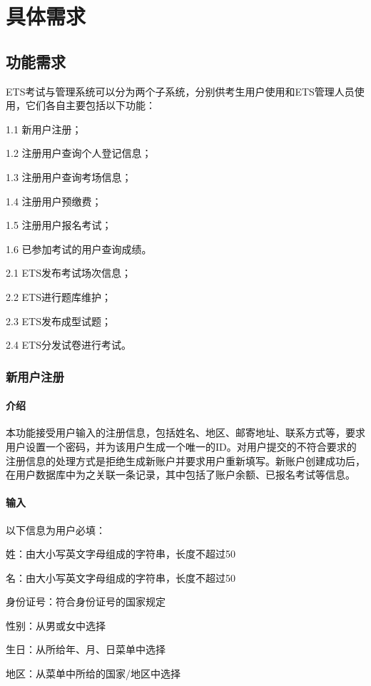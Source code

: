 \chapter{具体需求}

\section{功能需求}
ETS考试与管理系统可以分为两个子系统，分别供考生用户使用和ETS管理人员使用，它们各自主要包括以下功能：

1.1 新用户注册；

1.2 注册用户查询个人登记信息；

1.3 注册用户查询考场信息；

1.4 注册用户预缴费；

1.5 注册用户报名考试；

1.6 已参加考试的用户查询成绩。

2.1 ETS发布考试场次信息；

2.2 ETS进行题库维护；

2.3 ETS发布成型试题；

2.4 ETS分发试卷进行考试。

\subsection{新用户注册}

\subsubsection{介绍}
本功能接受用户输入的注册信息，包括姓名、地区、邮寄地址、联系方式等，要求用户设置一个密码，并为该用户生成一个唯一的ID。对用户提交的不符合要求的注册信息的处理方式是拒绝生成新账户并要求用户重新填写。新账户创建成功后，在用户数据库中为之关联一条记录，其中包括了账户余额、已报名考试等信息。

\subsubsection{输入}
以下信息为用户必填：

	姓：由大小写英文字母组成的字符串，长度不超过50

	名：由大小写英文字母组成的字符串，长度不超过50

	身份证号：符合身份证号的国家规定

	性别：从男或女中选择

	生日：从所给年、月、日菜单中选择

	地区：从菜单中所给的国家/地区中选择

